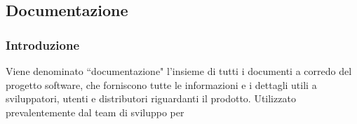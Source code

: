 \subsection{Documentazione}
\subsubsection{Introduzione}
Viene denominato ``documentazione" l'insieme di tutti i documenti a corredo del progetto software, che forniscono tutte le informazioni e i dettagli utili a sviluppatori, utenti e distributori riguardanti il prodotto.
Utilizzato prevalentemente dal team di sviluppo per 